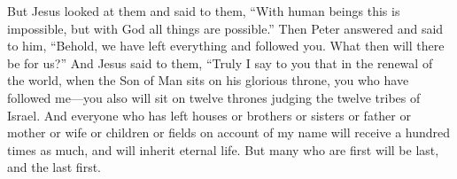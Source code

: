 \begin{biblechapter}
\verse But Jesus looked at them and said to them, “With human beings this is impossible, but with God all things are possible.”
\verse Then Peter answered and said to him, “Behold, we have left everything and followed you. What then will there be for us?”
\verse And Jesus said to them, “Truly I say to you that in the renewal of the world, when the Son of Man sits on his glorious throne, you who have followed me—you also will sit on twelve thrones judging the twelve tribes of Israel.
\verse And everyone who has left houses or brothers or sisters or father or mother or wife or children or fields on account of my name will receive a hundred times as much, and will inherit eternal life.
\verse But many who are first will be last, and the last first.
\end{biblechapter}

